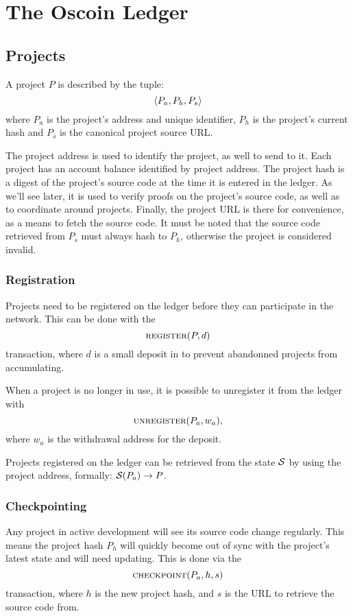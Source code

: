 \section{The Oscoin Ledger}

\subsection{Projects}
\label{s:projects}

A project $P$ is described by the tuple:
\[
    \langle P_{a}, P_h, P_s \rangle
\]
where $P_{a}$ is the project's address and unique identifier, $P_h$ is
the project's current hash and $P_s$ is the canonical project source URL.

The project address is used to identify the project, as well to send
\oscoin{} to it. Each project has an account balance identified by project
address. The project hash is a digest of the project's source code at the time
it is entered in the ledger. As we'll see later, it is used to verify proofs
on the project's source code, as well as to coordinate around projects. Finally,
the project URL is there for convenience, as a means to fetch the source code.
It must be noted that the source code retrieved from $P_s$ must always hash to
$P_h$, otherwise the project is considered invalid.

\subsubsection{Registration} Projects need to be registered on the ledger
before they can participate in the network. This can be done with the
\[
    \text{\normalfont\scshape register}\small{\lparen P, d\rparen}
\]
transaction, where $d$ is a small deposit in \oscoin{} to prevent abandonned
projects from accumulating.

When a project is no longer in use, it is possible to unregister it from the
ledger with
\[
    \text{\normalfont\scshape unregister}\small{\lparen P_a, w_a\rparen},
\]
where $w_a$ is the withdrawal address for the deposit.

Projects registered on the ledger can be retrieved from the state $\mathcal{S}$ by
using the project address, formally: $\mathcal{S}(P_a) \to P$.

\subsubsection{Checkpointing} Any project in active development will see its
source code change regularly. This means the project hash $P_h$ will quickly
become out of sync with the project's latest state and will need updating. This
is done via the
\[
    \text{\normalfont\scshape checkpoint}\small{\lparen P_a, h, s\rparen}
\]
transaction, where $h$ is the new project hash, and $s$ is the URL to retrieve
the source code from.

